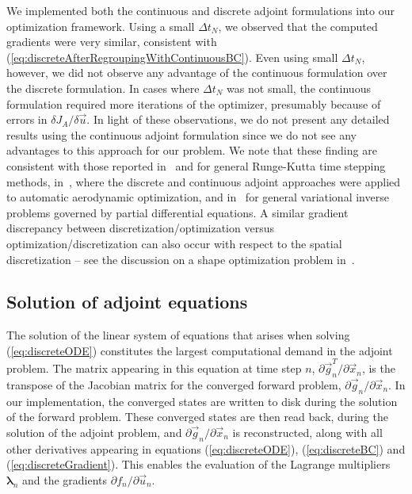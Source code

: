 \documentclass[twocolumn,numbook]{svjour3}          %
\def\u{{\vec u}}
\def\x{{\vec x}}
\def\p{{\vec{g}}}
\def\blambda{{\pmb{\lambda}}}%
\def\myobj{J}
\begin{document}
We implemented both the continuous and discrete adjoint formulations into our
optimization framework. Using a small $\Delta t_N$, we observed that the
computed gradients were very similar, consistent with
(\ref{eq:discreteAfterRegroupingWithContinuousBC}). Even using small $\Delta
t_N$, however, we did not observe any advantage of the continuous formulation
over the discrete formulation. In cases where $\Delta t_N$ was not small, the
continuous formulation required more iterations of the optimizer, presumably
because of errors in $\delta \myobj_A / \delta \u$. In light of these observations,
we do not present any detailed results using the continuous adjoint
formulation since we do not see any advantages to this approach for our
problem. We note that these finding are consistent with those reported
in~\cite{Hager2000} and \cite{Walther2007} for general Runge-Kutta
time stepping methods, 
in~\cite{Nadarajah:2000}, where the discrete and continuous adjoint
approaches were applied to automatic  aerodynamic optimization, and
in~\cite{Petra2011} for general variational inverse problems governed
by partial differential equations. A
 similar gradient discrepancy between discretization/optimization
 versus optimization/discretization can also occur with respect to the
 spatial discretization -- see the discussion on a shape
 optimization problem in~\cite{GunzburgerBook}. 



\subsection{Solution of adjoint equations} The solution of the linear system of
equations that arises when solving (\ref{eq:discreteODE}) constitutes the
largest computational demand in the adjoint problem. The matrix appearing in
this equation at time step $n$, $\partial {\p_n^T}/\partial {\x_n}$, is
the transpose of the Jacobian matrix for the converged forward problem,
    $\partial {\p_n}/\partial {\x_n}$. In our implementation, the converged
    states are written to disk during the solution of the forward problem. These
converged states are then read back, during the solution of the adjoint problem,
          and $\partial {\p_n}/\partial {\x_n}$ is reconstructed, along with all
other derivatives appearing in equations (\ref{eq:discreteODE}),
      (\ref{eq:discreteBC}) and (\ref{eq:discreteGradient}). This enables the
      evaluation of the Lagrange multipliers $\blambda_n$ and the gradients
      $\partial f_n/\partial {\u_n}$.
\end{document}
